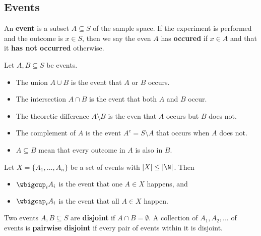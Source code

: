\documentclass{article}
\begin{document}
\subsection{Events}
\begin{definition}
	An \textbf{event} is a subset $A\subseteq S$ of the sample space. If the experiment is performed and the
	outcome is $x\in S$, then we say the even $A$ has \textbf{occured} if $x\in A$ and that it \textbf{has not occurred}
	otherwise.
\end{definition}
\begin{theorem}
	Let $A,B\subseteq S$ be events.
	\begin{itemize}
		\item The union $A\cup B$ is the event that $A$ or $B$ occurs.
		\item The intersection $A\cap B$ is the event that both $A$ and $B$ occur.
		\item The theoretic difference $A\setminus B$ is the even that $A$ occurs but $B$ does not.
		\item The complement of $A$ is the event $A^c=S\setminus A$ that occurs when $A$ does not.
		\item $A\subseteq B$ mean that every outcome in $A$ is also in $B$.
	\end{itemize}
\end{theorem}
\begin{definition}
	Let $X=\{A_1, ..., A_n\}$ be a set of events with $|X|\leq |\N|$. Then
	\begin{itemize}
		\item $\wbigcup_i A_i$ is the event that one $A\in X$ happens, and
		\item $\wbigcap_i A_i$ is the event that all $A\in X$ happen.
	\end{itemize}
\end{definition}
\begin{definition}
	Two events $A,B\subseteq S$ are \textbf{disjoint} if $A\cap B=\emptyset$.
	A collection of $A_1, A_2,...$ of events is \textbf{pairwise disjoint} if every pair of
	events within it is disjoint.
\end{definition}
\end{document}
